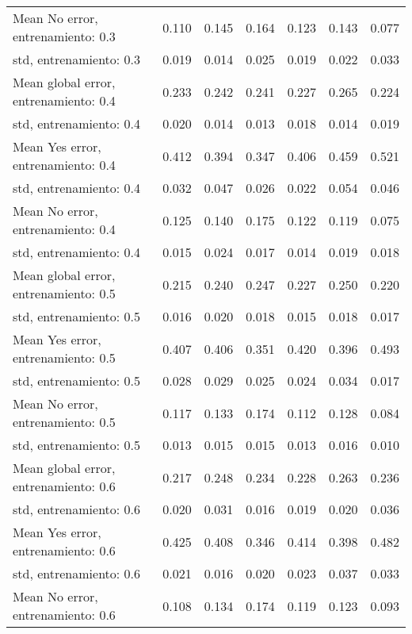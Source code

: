 \begin{longtable}{p{4cm}|p{1.5cm}|p{1.5cm}|p{1.5cm}|p{1.5cm}|p{1.5cm}|p{1.5cm}}
Mean No error, entrenamiento: 0.3     & 0.110 & 0.145 &        0.164 &     0.123 &     0.143 & 0.077 \\
std, entrenamiento: 0.3               & 0.019 & 0.014 &        0.025 &     0.019 &     0.022 & 0.033 \\
Mean global error, entrenamiento: 0.4 & 0.233 & 0.242 &        0.241 &     0.227 &     0.265 & 0.224 \\
std, entrenamiento: 0.4               & 0.020 & 0.014 &        0.013 &     0.018 &     0.014 & 0.019 \\
Mean Yes error, entrenamiento: 0.4    & 0.412 & 0.394 &        0.347 &     0.406 &     0.459 & 0.521 \\
std, entrenamiento: 0.4               & 0.032 & 0.047 &        0.026 &     0.022 &     0.054 & 0.046 \\
Mean No error, entrenamiento: 0.4     & 0.125 & 0.140 &        0.175 &     0.122 &     0.119 & 0.075 \\
std, entrenamiento: 0.4               & 0.015 & 0.024 &        0.017 &     0.014 &     0.019 & 0.018 \\
Mean global error, entrenamiento: 0.5 & 0.215 & 0.240 &        0.247 &     0.227 &     0.250 & 0.220 \\
std, entrenamiento: 0.5               & 0.016 & 0.020 &        0.018 &     0.015 &     0.018 & 0.017 \\
Mean Yes error, entrenamiento: 0.5    & 0.407 & 0.406 &        0.351 &     0.420 &     0.396 & 0.493 \\
std, entrenamiento: 0.5               & 0.028 & 0.029 &        0.025 &     0.024 &     0.034 & 0.017 \\
Mean No error, entrenamiento: 0.5     & 0.117 & 0.133 &        0.174 &     0.112 &     0.128 & 0.084 \\
std, entrenamiento: 0.5               & 0.013 & 0.015 &        0.015 &     0.013 &     0.016 & 0.010 \\
Mean global error, entrenamiento: 0.6 & 0.217 & 0.248 &        0.234 &     0.228 &     0.263 & 0.236 \\
std, entrenamiento: 0.6               & 0.020 & 0.031 &        0.016 &     0.019 &     0.020 & 0.036 \\
Mean Yes error, entrenamiento: 0.6    & 0.425 & 0.408 &        0.346 &     0.414 &     0.398 & 0.482 \\
std, entrenamiento: 0.6               & 0.021 & 0.016 &        0.020 &     0.023 &     0.037 & 0.033 \\
Mean No error, entrenamiento: 0.6     & 0.108 & 0.134 &        0.174 &     0.119 &     0.123 & 0.093 \\

\end{longtable}
